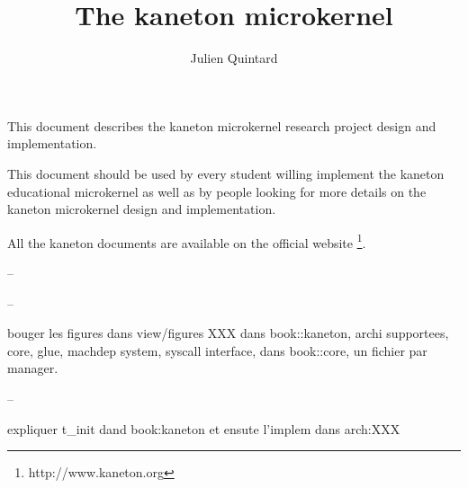%
%
%
%
%
%

%
%

%
%

\def\path{../..}

%
%



%
%

\rhead{}

%
%

\title{The kaneton microkernel
       \logos}

%
%

\author{\small{Julien Quintard}}

%
%



%
%

\maketitle

%
%

This document describes the kaneton microkernel research project design
and implementation.

\-

This document should be used by every student willing implement the
kaneton educational microkernel as well as by people looking for more
details on the kaneton microkernel design and implementation.

\-

All the kaneton documents are available on
the official website
  \footnote{http://www.kaneton.org}.

%
%

\toc

%
%




% 






--

--

bouger les figures dans view/figures
XXX dans book::kaneton, archi supportees, core, glue, machdep system, syscall
    interface, dans book::core, un fichier par manager.

--

expliquer t_init dand book:kaneton et ensute l'implem dans arch:XXX

